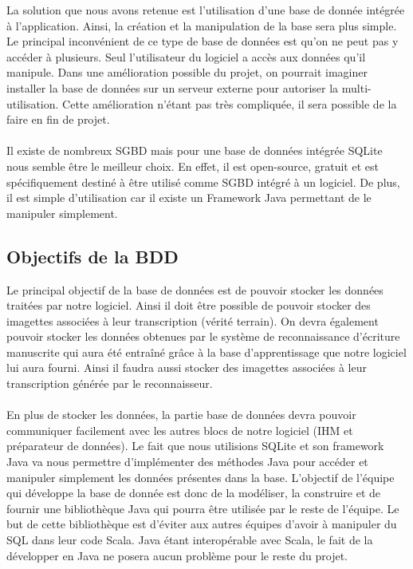 La solution que nous avons retenue est l’utilisation d’une base de donnée intégrée à l’application. Ainsi, la création et la manipulation de la base sera plus simple. Le principal inconvénient de ce type de base de données est qu’on ne peut pas y accéder à plusieurs. Seul l’utilisateur du logiciel a accès aux données qu’il manipule.
Dans une amélioration possible du projet, on pourrait imaginer installer la base de données sur un serveur externe pour autoriser la multi-utilisation. Cette amélioration n’étant pas très compliquée, il sera possible de la faire en fin de projet.

\paragraph{}

Il existe de nombreux SGBD mais pour une base de données intégrée SQLite nous semble être le meilleur choix. En effet, il est open-source, gratuit et est spécifiquement destiné à être utilisé comme SGBD intégré à un logiciel. De plus, il est simple d’utilisation car il existe un Framework Java permettant de le manipuler simplement.

\subsection{Objectifs de la BDD}

Le principal objectif de la base de données est de pouvoir stocker les données traitées par notre logiciel. Ainsi il doit être possible de pouvoir stocker des imagettes associées à leur transcription (vérité terrain). On devra également pouvoir stocker les données obtenues par le système de reconnaissance d’écriture manuscrite qui aura été entraîné grâce à la base d’apprentissage que notre logiciel lui aura fourni. Ainsi il faudra aussi stocker des imagettes associées à leur transcription générée par le reconnaisseur. 

\paragraph{}

En plus de stocker les données, la partie base de données devra pouvoir communiquer facilement avec les autres blocs de notre logiciel (IHM et préparateur de données). Le fait que nous utilisions SQLite et son framework Java va nous permettre d’implémenter des méthodes Java pour accéder et manipuler simplement les données présentes dans la base. L’objectif de l’équipe qui développe la base de donnée est donc de la modéliser, la construire et de fournir une bibliothèque Java qui pourra être utilisée par le reste de l’équipe. Le but de cette bibliothèque est d’éviter aux autres équipes d’avoir à manipuler du SQL dans leur code Scala. Java étant interopérable avec Scala, le fait de la développer en Java ne posera aucun problème pour le reste du projet.

